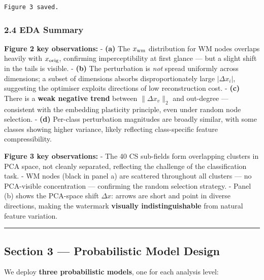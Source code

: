 \documentclass[11pt]{article}
\begin{document}
    \begin{Verbatim}[commandchars=\\\{\}]
Figure 3 saved.
    \end{Verbatim}

    \subsubsection{2.4 EDA Summary}\label{eda-summary}

\textbf{Figure 2 key observations:} - \textbf{(a)} The \(x_{\rm wm}\)
distribution for WM nodes overlaps heavily with \(x_{\rm orig}\),
confirming imperceptibility at first glance --- but a slight shift in
the tails is visible. - \textbf{(b)} The perturbation is \emph{not}
spread uniformly across dimensions; a subset of dimensions absorbs
disproportionately large \(|\Delta x_i|\), suggesting the optimiser
exploits directions of low reconstruction cost. - \textbf{(c)} There is
a \textbf{weak negative trend} between \(\|\Delta x_v\|_2\) and
out-degree --- consistent with the embedding plasticity principle, even
under random node selection. - \textbf{(d)} Per-class perturbation
magnitudes are broadly similar, with some classes showing higher
variance, likely reflecting class-specific feature compressibility.

\textbf{Figure 3 key observations:} - The 40 CS sub-fields form
overlapping clusters in PCA space, not cleanly separated, reflecting the
challenge of the classification task. - WM nodes (black in panel a) are
scattered throughout all clusters --- no PCA-visible concentration ---
confirming the random selection strategy. - Panel (b) shows the
PCA-space shift \(\Delta x\): arrows are short and point in diverse
directions, making the watermark \textbf{visually indistinguishable}
from natural feature variation.

    \begin{center}\rule{0.5\linewidth}{0.5pt}\end{center}

\subsection{Section 3 --- Probabilistic Model
Design}\label{section-3-probabilistic-model-design}

We deploy \textbf{three probabilistic models}, one for each analysis
level:
\end{document}

